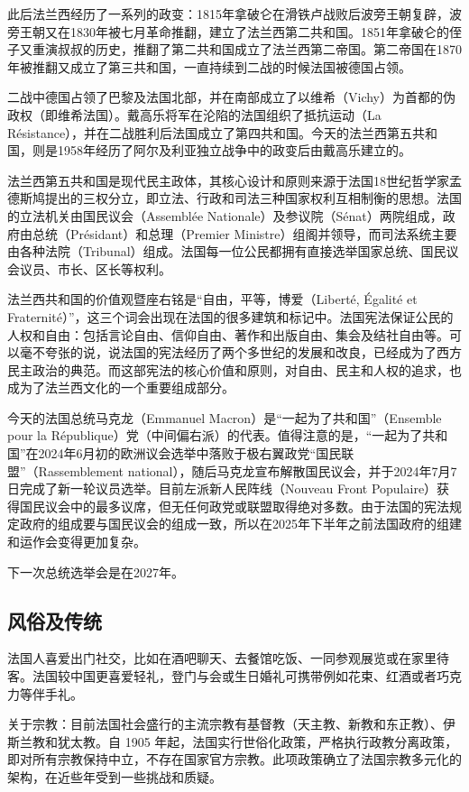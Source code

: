 \documentclass[UTF8]{ctexart}
\begin{document}
此后法兰西经历了一系列的政变：1815年拿破仑在滑铁卢战败后波旁王朝复辟，波旁王朝又在1830年被七月革命推翻，建立了法兰西第二共和国。1851年拿破仑的侄子又重演叔叔的历史，推翻了第二共和国成立了法兰西第二帝国。第二帝国在1870年被推翻又成立了第三共和国，一直持续到二战的时候法国被德国占领。

二战中德国占领了巴黎及法国北部，并在南部成立了以维希（Vichy）为首都的伪政权（即维希法国）。戴高乐将军在沦陷的法国组织了抵抗运动（La Résistance），并在二战胜利后法国成立了第四共和国。今天的法兰西第五共和国，则是1958年经历了阿尔及利亚独立战争中的政变后由戴高乐建立的。

法兰西第五共和国是现代民主政体，其核心设计和原则来源于法国18世纪哲学家孟德斯鸠提出的三权分立，即立法、行政和司法三种国家权利互相制衡的思想。法国的立法机关由国民议会（Assemblée Nationale）及参议院（Sénat）两院组成，政府由总统（Présidant）和总理（Premier Ministre）组阁并领导，而司法系统主要由各种法院（Tribunal）组成。法国每一位公民都拥有直接选举国家总统、国民议会议员、市长、区长等权利。

法兰西共和国的价值观暨座右铭是“自由，平等，博爱（Liberté, Égalité et Fraternité）”，这三个词会出现在法国的很多建筑和标记中。法国宪法保证公民的人权和自由：包括言论自由、信仰自由、著作和出版自由、集会及结社自由等。可以毫不夸张的说，说法国的宪法经历了两个多世纪的发展和改良，已经成为了西方民主政治的典范。而这部宪法的核心价值和原则，对自由、民主和人权的追求，也成为了法兰西文化的一个重要组成部分。

今天的法国总统马克龙（Emmanuel Macron）是“一起为了共和国”（Ensemble pour la République）党（中间偏右派）的代表。值得注意的是，“一起为了共和国”在2024年6月初的欧洲议会选举中落败于极右翼政党“国民联盟”（Rassemblement national），随后马克龙宣布解散国民议会，并于2024年7月7日完成了新一轮议员选举。目前左派新人民阵线（Nouveau Front Populaire）获得国民议会中的最多议席，但无任何政党或联盟取得绝对多数。由于法国的宪法规定政府的组成要与国民议会的组成一致，所以在2025年下半年之前法国政府的组建和运作会变得更加复杂。

下一次总统选举会是在2027年。

\subsection{风俗及传统}
法国人喜爱出门社交，比如在酒吧聊天、去餐馆吃饭、一同参观展览或在家里待客。法国较中国更喜爱轻礼，登门与会或生日婚礼可携带例如花束、红酒或者巧克力等伴手礼。

关于宗教：目前法国社会盛行的主流宗教有基督教（天主教、新教和东正教）、伊斯兰教和犹太教。自 1905 年起，法国实行世俗化政策，严格执行政教分离政策，即对所有宗教保持中立，不存在国家官方宗教。此项政策确立了法国宗教多元化的架构，在近些年受到一些挑战和质疑。
\end{document}
